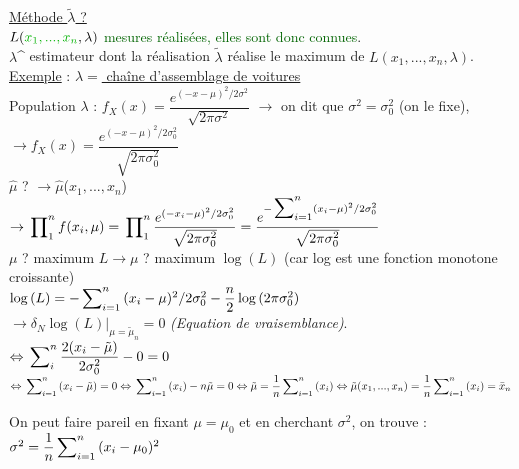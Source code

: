 \documentclass{article}
\newcommand{\lti}{\tilde{\lambda}}
\newcommand{\mti}{\tilde{\mu}}
\newcommand{\lcha}{\hat{\lambda}}
\newcommand{\mcha}{\hat{\mu}}
\begin{document}
\noindent \underline{Méthode $\lti $ ?} \\

\noindent $L(\textcolor{darkgreen}{x_1,...,x_n},\lambda)$ \textcolor{darkgreen}{mesures réalisées, elles sont donc connues}.\\
$\lambda$\^{} estimateur dont la réalisation $\lti$ réalise le maximum de $L(x_1,...,x_n,\lambda)$. \\

\noindent\underline{Exemple} : \underline{$\lcha = $ chaîne d'assemblage de voitures} \\
Population $\lambda$ : $f_X(x) = \dfrac{e^{(-x-\mu)^2 / 2\sigma^2}}{\sqrt{2\pi\sigma^2}}$
$\rightarrow$ on dit que $\sigma^2 = \sigma_0^2$ (on le fixe), \\
$\rightarrow f_X(x) = \dfrac{e^{(-x-\mu)^2 / 2\sigma_0^2}}{\sqrt{2\pi\sigma_0^2}} $ \\
$\mcha$ ? $\rightarrow \mcha$($x_1,...,x_n$) \\
$\rightarrow \sideset{}{_1^n}\prod{f(x_i,\mu)} \\ 
= \sideset{}{_1^n}\prod{\dfrac{e^{(-x_i-\mu)^2 / 2\sigma_0^2}}{\sqrt{2\pi\sigma_0^2}}} \\
= \dfrac{e^{-\sideset{}{_{i=1}^n}\sum(x_i-\mu)^2 / 2\sigma_0^2}} {\sqrt{2\pi\sigma_0^2}}$ \\
$\mu$ ? maximum $L \rightarrow \mu$ ? maximum $\log{(L)}$ (car log est une fonction monotone croissante) \\
$\log{(L)} = -\sideset{}{_{i=1}^n}\sum{(x_i-\mu)^2 / 2\sigma_0^2} - \dfrac{n}{2} \log{(2\pi\sigma_0^2)}$ \\
$\rightarrow \delta_N\log{(L)} |_{\mu = \mti_n} = 0$ \textit{(Equation de vraisemblance)}. \\
$\Leftrightarrow \sideset{}{_i^n}\sum\dfrac{2(x_i-\mti)}{2\sigma_0^2} - 0 = 0$ \\
$\Leftrightarrow \sideset{}{_{i=1}^n}\sum{(x_i-\mti)} = 0 \\
\Leftrightarrow \sideset{}{_{i=1}^n}\sum{(x_i)} - n\mti = 0 \\
\Leftrightarrow \mti = \dfrac{1}{n} \sideset{}{_{i=1}^n}\sum{(x_i)} \\
\Leftrightarrow \mti(x_1,...,x_n) = \dfrac{1}{n}\sideset{}{_{i=1}^n}\sum{(x_i)} = \bar{x}_n$

\noindent On peut faire pareil en fixant $\mu = \mu_0$ et en cherchant $\sigma^2$, on trouve : 
$\sigma^2 = \dfrac{1}{n} \sideset{}{_{i=1}^n}\sum{(x_i-\mu_0)^2}$
\end{document}

